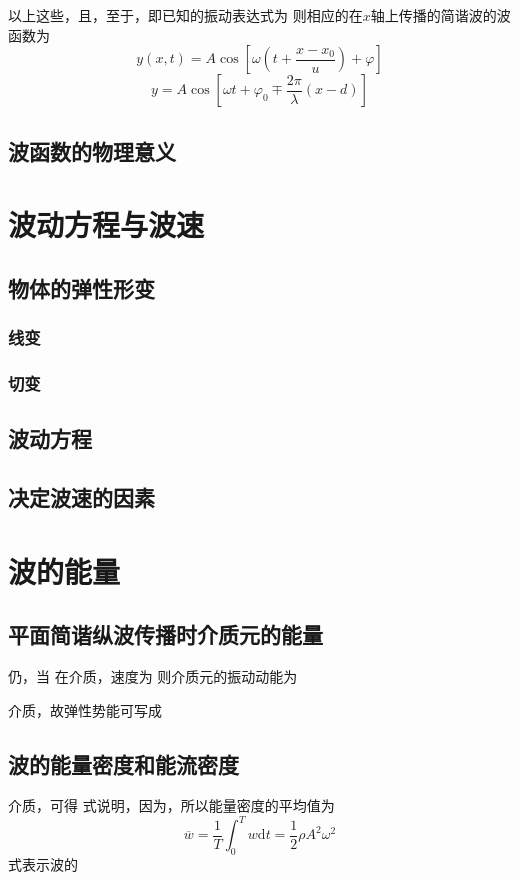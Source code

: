     以上这些，且，至于，即已知的振动表达式为
    则相应的在$x$轴上传播的简谐波的波函数为
    \[
    y(x,t)=A\cos{\left[\omega\left(t+\frac{x-x_0}{u}\right)+\varphi\right]}
    \]
    \[
    y = A \cos\left[\omega t + \varphi_0 \mp \frac{2\pi}{\lambda} (x - d)\right]
    \]
    \subsection{波函数的物理意义}

\section{波动方程与波速}
    \subsection{物体的弹性形变}
        \subsubsection{线变}
        \subsubsection{切变}
    \subsection{波动方程}
    \subsection{决定波速的因素}

\section{波的能量}
    \subsection{平面简谐纵波传播时介质元的能量}
    仍，当
    在介质，速度为
    则介质元的振动动能为

    介质，故弹性势能可写成
    \subsection{波的能量密度和能流密度}
    介质，可得
    式说明，因为，所以能量密度的平均值为
    \[
    \overline{w}=\frac{1}{T}\int^T_0 w\mathrm{d}t=\frac{1}{2}\rho A^2 \omega^2
    \]
    式表示波的

